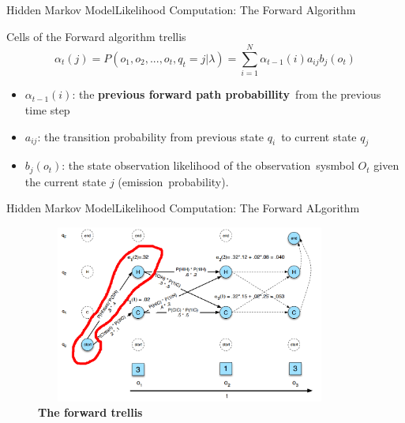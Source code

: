 \documentclass[10pt]{beamer}
\begin{document}
\begin{frame}{Hidden Markov Model}{Likelihood Computation: The Forward Algorithm}
    \begin{block}{Cells of the Forward algorithm trellis}
        \begin{equation}
            \alpha_t(j) = P(o_1, o_2, ..., o_t, q_t = j|\lambda) = \sum_{i=1}^{N}\alpha_{t-1}(i)a_{ij}b_j(o_t)
        \end{equation}
    \end{block}
    \begin{itemize}
        \item $\alpha_{t-1}(i)$: the \textbf{previous forward path probabillity}\
                             from the previous time step
        \item $a_{ij}$: the transition probability from previous state $q_i$\
                        to current state $q_j$
        \item $b_j(o_t)$: the state observation likelihood of the observation\
                          sysmbol $O_t$ given the current state $j$ (emission\
                          probability).
    \end{itemize}
\end{frame}

\begin{frame}{Hidden Markov Model}{Likelihood Computation: The Forward ALgorithm}
  \begin{figure}[h]
    \centering
    \includegraphics[width=4in,height=2.3in]{figures/the_forward_trellis_cells.png}
    \caption {\textbf{The forward trellis}}
  \end{figure}
\end{frame}
\end{document}
